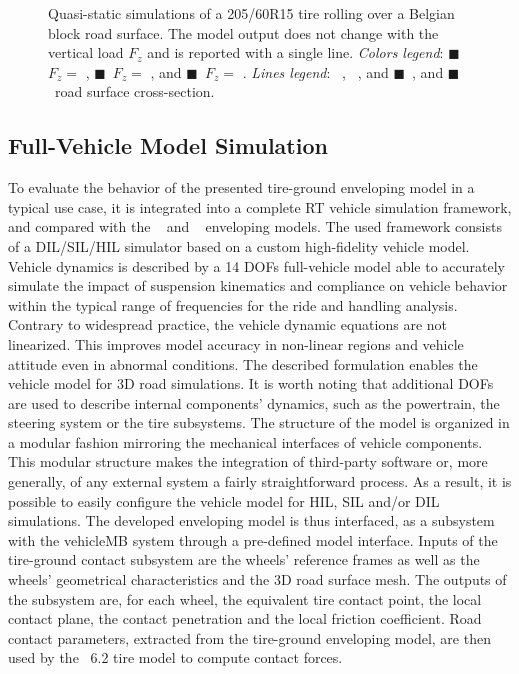 \begin{figure}[htb]
  \centering
  \small{}
  \caption{Quasi-static simulations of a 205/60R15 tire rolling over a Belgian block road surface. The \TMEasy{} model output does not change with the vertical load $F_z$ and is reported with a single line. \emph{Colors legend}: {\color{mycolor1}$\blacksquare$}~$F_z =$ , {\color{mycolor2}$\blacksquare$}~$F_z =$ , and {\color{mycolor3}$\blacksquare$}~$F_z =$ . \emph{Lines legend}: \raisebox{1.0pt}{\textbf{---}}~\Enve{}, \raisebox{1.0pt}{\textbf{--~--}}~\Swift{}, and {\color{mycolor5}$\blacksquare$}~\TMEasy{}, and {\color{black}$\blacksquare$}~road surface cross-section.}
  \label{app2:fig:cobblestone}
\end{figure}


\subsection{Full-Vehicle Model Simulation}
\label{app2:sec:simulator}

To evaluate the behavior of the presented tire-ground enveloping model in a typical use case, it is integrated into a complete \ac{RT} vehicle simulation framework, and compared with the \Swift{}~\cite{schmeitz2004semiempirical} and \TMEasy~\cite{rill2013tmeasy, rill2018sophisticated}{} enveloping models. The used framework consists of a DIL/SIL/HIL simulator based on a custom high-fidelity vehicle model. Vehicle dynamics is described by a 14 \acp{DOF} full-vehicle model able to accurately simulate the impact of suspension kinematics and compliance on vehicle behavior within the typical range of frequencies for the ride and handling analysis. Contrary to widespread practice, the vehicle dynamic equations are not linearized. This improves model accuracy in non-linear regions and vehicle attitude even in abnormal conditions. The described formulation enables the vehicle model for 3D road simulations. It is worth noting that additional \acp{DOF} are used to describe internal components' dynamics, such as the powertrain, the steering system or the tire subsystems. The structure of the model is organized in a modular fashion mirroring the mechanical interfaces of vehicle components. This modular structure makes the integration of third-party software or, more generally, of any external system a fairly straightforward process. As a result, it is possible to easily configure the vehicle model for HIL, SIL and/or DIL simulations. The developed enveloping model is thus interfaced, as a subsystem with the vehicle\ac{MB} system through a pre-defined model interface. Inputs of the tire-ground contact subsystem are the wheels' reference frames as well as the wheels' geometrical characteristics and the 3D road surface mesh. The outputs of the subsystem are, for each wheel, the equivalent tire contact point, the local contact plane, the contact penetration and the local friction coefficient. Road contact parameters, extracted from the tire-ground enveloping model, are then used by the \MagicFormulae{}~6.2 tire model to compute contact forces.


